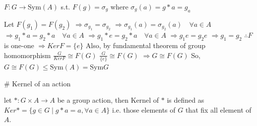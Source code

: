 $F: G \to \text{Sym}(A)$ s.t.
$F(g) = \sigma_g$
where $\sigma_g(a) = g * a = g_a$

Let $F(g_1) = F(g_2)$
$\Rightarrow \sigma_{g_1} = \sigma_{g_2}$
$\Rightarrow \sigma_{g_1}(a) = \sigma_{g_2}(a) \quad \forall a \in A$
$\Rightarrow g_1 * a = g_2 * a \quad \forall a \in A$
$\Rightarrow g_1 * e = g_2 * a \quad \forall a \in A$
$\Rightarrow g_1 e = g_2 e$
$\Rightarrow g_1 = g_2$
$\therefore F$ is one-one
$\Rightarrow Ker F = \{e\}$
Also, by fundamental theorem of group homomorphism
$\frac{G}{Ker F} \cong F(G)$
$\frac{G}{\{e\}} \cong F(G)$
$\Rightarrow G \cong F(G)$
So, $G \cong F(G) \le \text{Sym}(A) = \text{Sym} G$

# Kernel of an action

let $*: G \times A \to A$ be a group action, then Kernel of $*$ is defined as
$Ker * = \{g \in G \mid g * a = a, \forall a \in A\}$
i.e. those elements of $G$ that fix all element of $A$.
